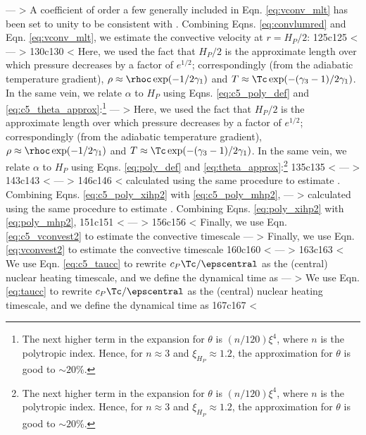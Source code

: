---
> \noindent A coefficient of order a few generally included in Eqn. \ref{eq:vconv_mlt} has been set to unity to be consistent with \citeal{piroc08}.  Combining Eqns. \ref{eq:convlumred} and Eqn. \ref{eq:vconv_mlt}, we estimate the convective velocity at $r = H_P/2$:
125c125
< \label{eq:c5_vconvest}
---
> \label{eq:vconvest}
130c130
< \noindent Here, we used the fact that $H_P/2$ is the approximate length over which pressure decreases by a factor of $e^{1/2}$; correspondingly (from the adiabatic temperature gradient), $\rho \approx \rhoc\exp(-1/2\gamma_1)$ and $T \approx \Tc\exp(-(\gamma_3 - 1)/2\gamma_1)$.  In the same vein, we relate $\alpha$ to $H_P$ using Eqns. \ref{eq:c5_poly_def} and \ref{eq:c5_theta_approx}:\footnote{The next higher term in the expansion for $\theta$ is $(n/120)\xi^4$, where $n$ is the polytropic index.  Hence, for $n \approx 3$ and $\xi_{H_P} \approx 1.2$, the approximation for $\theta$ is good to $\sim20$\%.}
---
> \noindent Here, we used the fact that $H_P/2$ is the approximate length over which pressure decreases by a factor of $e^{1/2}$; correspondingly (from the adiabatic temperature gradient), $\rho \approx \rhoc\exp(-1/2\gamma_1)$ and $T \approx \Tc\exp(-(\gamma_3 - 1)/2\gamma_1)$.  In the same vein, we relate $\alpha$ to $H_P$ using Eqns. \ref{eq:poly_def} and \ref{eq:theta_approx}:\footnote{The next higher term in the expansion for $\theta$ is $(n/120)\xi^4$, where $n$ is the polytropic index.  Hence, for $n \approx 3$ and $\xi_{H_P} \approx 1.2$, the approximation for $\theta$ is good to $\sim20$\%.}
135c135
< \label{eq:c5_poly_xihp2}
---
> \label{eq:poly_xihp2}
143c143
< \label{eq:c5_poly_mhp2}
---
> \label{eq:poly_mhp2}
146c146
< \noindent calculated using the same procedure to estimate \Lconv.  Combining Eqns. \ref{eq:c5_poly_xihp2} with \ref{eq:c5_poly_mhp2},
---
> \noindent calculated using the same procedure to estimate \Lconv.  Combining Eqns. \ref{eq:poly_xihp2} with \ref{eq:poly_mhp2},
151c151
< \label{eq:c5_vconvest2}
---
> \label{eq:vconvest2}
156c156
< Finally, we use Eqn. \ref{eq:c5_vconvest2} to estimate the convective timescale
---
> Finally, we use Eqn. \ref{eq:vconvest2} to estimate the convective timescale
160c160
< \label{eq:c5_tauconvest}
---
> \label{eq:tauconvest}
163c163
< \noindent We use Eqn. \ref{eq:c5_taucc} to rewrite $c_P\Tc/\epscentral$ as the (central) nuclear heating timescale, and we define the dynamical time as
---
> \noindent We use Eqn. \ref{eq:taucc} to rewrite $c_P\Tc/\epscentral$ as the (central) nuclear heating timescale, and we define the dynamical time as
167c167
< \label{eq:c5_taudyn}
